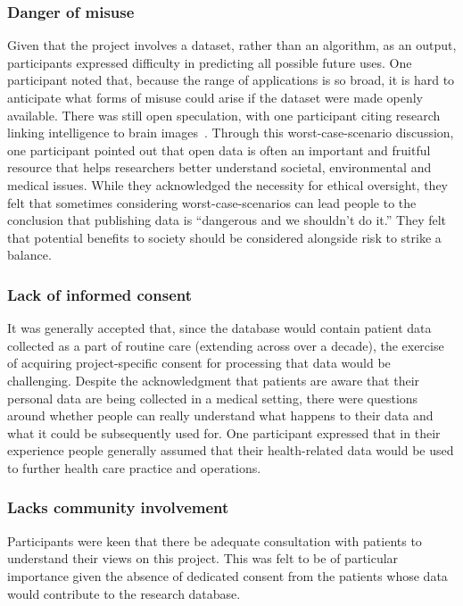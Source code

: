\documentclass{article}
\begin{document}
  
\subsubsection{Danger of misuse}

Given that the project involves a dataset, rather than an algorithm,
as an output, participants expressed difficulty in
predicting all possible future uses. One participant noted that,
because the range of applications is so broad, it is hard to
anticipate what forms of misuse could arise if the dataset were made
openly available. There was still open speculation, with one
participant citing research linking intelligence to brain
images~\cite{dubois}. Through this worst-case-scenario discussion,
one participant pointed out that open data is often an important and
fruitful resource that helps researchers better understand societal,
environmental and medical issues. While they acknowledged the
necessity for ethical oversight, they felt that sometimes considering
worst-case-scenarios can lead people to the conclusion that publishing data
is ``dangerous and we shouldn't do it.'' They felt that potential
benefits to society should be considered alongside risk to strike a
balance. 

\subsubsection{Lack of informed consent}

It was generally accepted that, since the database would contain
patient data collected as a part of routine care (extending across
over a decade), the exercise of
acquiring project-specific consent for processing that data would be
challenging. Despite the acknowledgment that patients are aware that
their personal data are being collected in a medical setting, there
were questions around whether people can really understand what
happens to their data and what it could be subsequently used for.
One participant expressed that in their experience people generally
assumed that their health-related data would be used to further
health care practice and operations.


\subsubsection{Lacks community involvement}

Participants were keen that there be adequate consultation with
patients to understand their views on this project. This was felt to
be of particular importance given the absence of dedicated consent
from the patients whose data would contribute to the research
database. 
\end{document}
